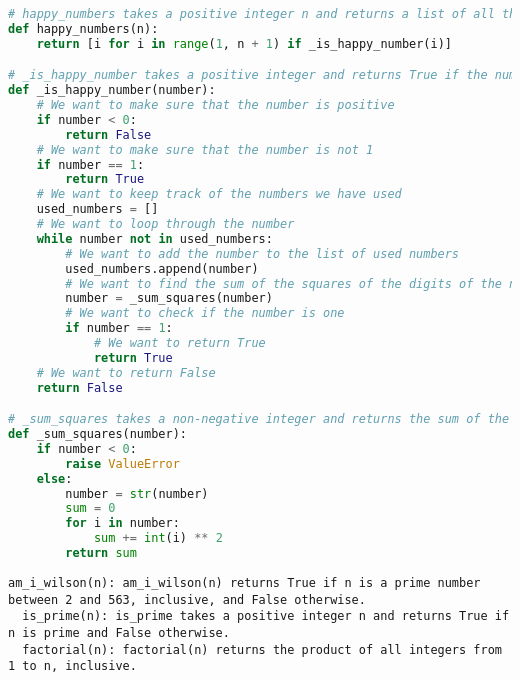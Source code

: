 \begin{figure*}
\begin{lstlisting}[language=Python]
# happy_numbers takes a positive integer n and returns a list of all the happy numbers between 1 and n, inclusive.
def happy_numbers(n):
    return [i for i in range(1, n + 1) if _is_happy_number(i)]

# _is_happy_number takes a positive integer and returns True if the number is a happy number, False otherwise.
def _is_happy_number(number):
    # We want to make sure that the number is positive
    if number < 0:
        return False
    # We want to make sure that the number is not 1
    if number == 1:
        return True
    # We want to keep track of the numbers we have used
    used_numbers = []
    # We want to loop through the number
    while number not in used_numbers:
        # We want to add the number to the list of used numbers
        used_numbers.append(number)
        # We want to find the sum of the squares of the digits of the number
        number = _sum_squares(number)
        # We want to check if the number is one
        if number == 1:
            # We want to return True
            return True
    # We want to return False
    return False

# _sum_squares takes a non-negative integer and returns the sum of the squares of its digits.
def _sum_squares(number):
    if number < 0:
        raise ValueError
    else:
        number = str(number)
        sum = 0
        for i in number:
            sum += int(i) ** 2
        return sum
\end{lstlisting}
\caption{Train Problem 3140, Solution 7}
\end{figure*}

\begin{figure*}
\begin{lstlisting}
am_i_wilson(n): am_i_wilson(n) returns True if n is a prime number between 2 and 563, inclusive, and False otherwise.
  is_prime(n): is_prime takes a positive integer n and returns True if n is prime and False otherwise.
  factorial(n): factorial(n) returns the product of all integers from 1 to n, inclusive.
\end{lstlisting}
\caption{Train Problem 3229, Solution 26}
\end{figure*}

